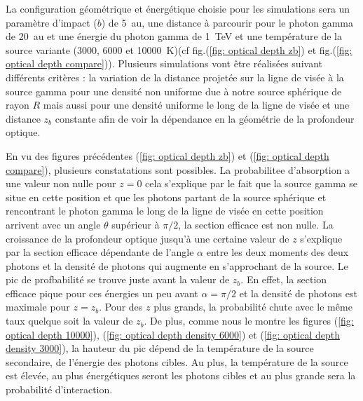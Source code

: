 \documentclass[a4paper,12pt,twoside]{article}
\begin{document}
La configuration géométrique et énergétique choisie pour les simulations sera un paramètre d'impact ($b$) de \SI{5}{\astronomicalunit}, une distance à parcourir pour le photon gamma de \SI{20}{\astronomicalunit} et une énergie du photon gamma de \SI{1}{\TeV} et une température de la source variante (3000, 6000 et \SI{10000}{\K})(cf fig.(\ref{fig: optical depth zb}) et fig.(\ref{fig: optical depth compare})). Plusieurs simulations vont être réalisées suivant différents critères : la variation de la distance projetée sur la ligne de visée à la source gamma pour une densité non uniforme due à notre source sphérique de rayon $R$ mais aussi pour une densité uniforme le long de la ligne de visée et une distance $z_b$ constante afin de voir la dépendance en la géométrie de la profondeur optique.

En vu des figures précédentes (\ref{fig: optical depth zb}) et (\ref{fig: optical depth compare}), plusieurs constatations sont possibles. La probabilitee d'absorption a une valeur non nulle pour $z = 0$ cela s'explique par le fait que la source gamma se situe en cette position et que les photons partant de la source sphérique et rencontrant le photon gamma le long de la ligne de visée en cette position arrivent avec un angle $\theta$ supérieur à $\pi/2$, la section efficace est non nulle. La croissance de la profondeur optique jusqu'à une certaine valeur de $z$ s'explique par la section efficace dépendante de l'angle $\alpha$ entre les deux moments des deux photons et la densité de photons qui augmente en s'approchant de la source. Le pic de profbabilité se trouve juste avant la valeur de $z_b$. En effet, la section efficace pique pour ces énergies un peu avant $\alpha = \pi/2$ et la densité de photons est maximale pour $z = z_b$. Pour des $z$ plus grands, la probabilité chute avec le même taux quelque soit la valeur de $z_b$. De plus, comme nous le montre les figures (\ref{fig: optical depth 10000}), (\ref{fig: optical depth density 6000}) et (\ref{fig: optical depth density 3000}), la hauteur du pic dépend de la température de la source secondaire, de l'énergie des photons cibles. Au plus, la température de la source est élevée, au plus énergétiques seront les photons cibles et au plus  grande sera la probabilité d'interaction.
\end{document}
